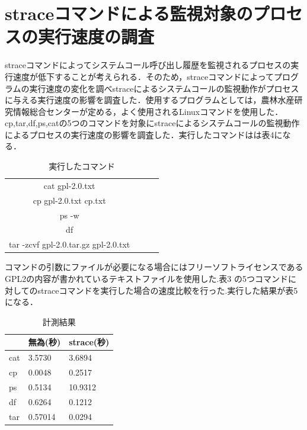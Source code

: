 \section{straceコマンドによる監視対象のプロセスの実行速度の調査}

straceコマンドによってシステムコール呼び出し履歴を監視されるプロセスの実行速度が低下することが考えられる．そのため，straceコマンドによってプログラムの実行速度の変化を調べstraceによるシステムコールの監視動作がプロセスに与える実行速度の影響を調査した．使用するプログラムとしては，農林水産研究情報総合センターが定める，よく使用されるLinuxコマンド\cite{Linux}を使用した．cp,tar,df,ps,catの5つのコマンドを対象にstraceによるシステムコールの監視動作によるプロセスの実行速度の影響を調査した．実行したコマンドはは表4になる．
\begin{table}[h]
   \caption{実行したコマンド}
   \centering
    \begin{tabular}{clll}
     \hline
     \hline
     cat gpl-2.0.txt \\
     cp gpl-2.0.txt cp.txt \\
     ps -w \\
     df \\
     tar -zcvf gpl-2.0.tar.gz gpl-2.0.txt \\
     \hline
    \end{tabular}
\end{table}

  コマンドの引数にファイルが必要になる場合にはフリーソフトライセンスであるGPL2の内容が書かれているテキストファイルを使用した.表3%
  の5つコマンドに対してのstraceコマンドを実行した場合の速度比較を行った.実行した結果が表5になる．

\begin{table}[h]
   \caption{計測結果} 
   \centering
  \begin{tabular}{|l|l|l|}
   \hline
   \multicolumn{1}{|c|}{} & 無為(秒)   & strace(秒) \\ \hline
   cat                    & 3.5730  & 3.6894    \\ \hline
   cp                     & 0.0048  & 0.2517    \\ \hline
   ps                     & 0.5134  & 10.9312   \\ \hline
   df                     & 0.6264  & 0.1212    \\ \hline
   tar                    & 0.57014 & 0.0294    \\ \hline
   \end{tabular}
\end{table}


